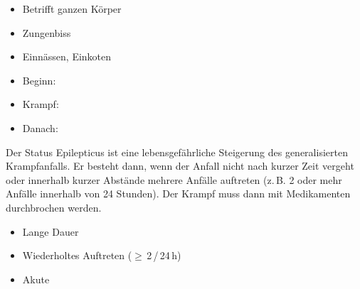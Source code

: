 {
\begin{itemize}
  \item Betrifft ganzen Körper
  \item Zungenbiss
  \item Einnässen, Einkoten
  \item Beginn:
  \item Krampf:
  \item Danach:
\end{itemize}

}
{}
{}
{}


{
Der Status Epilepticus ist eine
lebensgefährliche Steigerung
des generalisierten Krampfanfalls. Er besteht dann, wenn der
Anfall nicht nach kurzer Zeit vergeht oder innerhalb kurzer
Abstände mehrere Anfälle auftreten (z.\,B. 2 oder mehr Anfälle
innerhalb von 24 Stunden). Der Krampf muss dann mit Medikamenten
durchbrochen werden.
}
{
\begin{itemize}
  \item Lange Dauer
  \item Wiederholtes Auftreten ($\geq$\,2\,/\,24\,h)
  \item Akute 
\end{itemize}
}{}{}{}

{}



